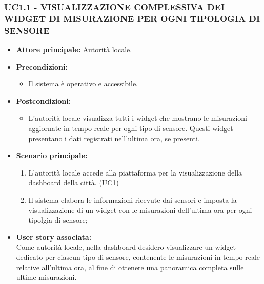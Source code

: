 \subsubsection{UC1.1 - VISUALIZZAZIONE COMPLESSIVA DEI WIDGET DI MISURAZIONE PER OGNI TIPOLOGIA DI SENSORE}
\begin{itemize}
    \item \textbf{Attore principale:} Autorità locale.
    \item \textbf{Precondizioni:}
        \begin{itemize}
            \item Il sistema è operativo e accessibile.
        \end{itemize}
    \item \textbf{Postcondizioni:}
        \begin{itemize}
            \item L'autorità locale visualizza tutti i widget che mostrano le misurazioni aggiornate in tempo reale per ogni tipo di sensore. Questi widget presentano i dati registrati nell'ultima ora, se presenti.
        \end{itemize}
    \item \textbf{Scenario principale:}
        \begin{enumerate}
            \item L'autorità locale accede alla piattaforma per la visualizzazione della dashboard della città. (UC1)
            \item Il sistema elabora le informazioni ricevute dai sensori e imposta la visualizzazione di un widget con le misurazioni dell'ultima ora per ogni tipolgia di sensore;
        \end{enumerate}
    \item \textbf{User story associata:} \\
        Come autorità locale, nella dashboard desidero visualizzare un widget dedicato per ciascun tipo di sensore, contenente le misurazioni in tempo reale relative all'ultima ora, al fine di ottenere una panoramica completa sulle ultime misurazioni.
\end{itemize}
